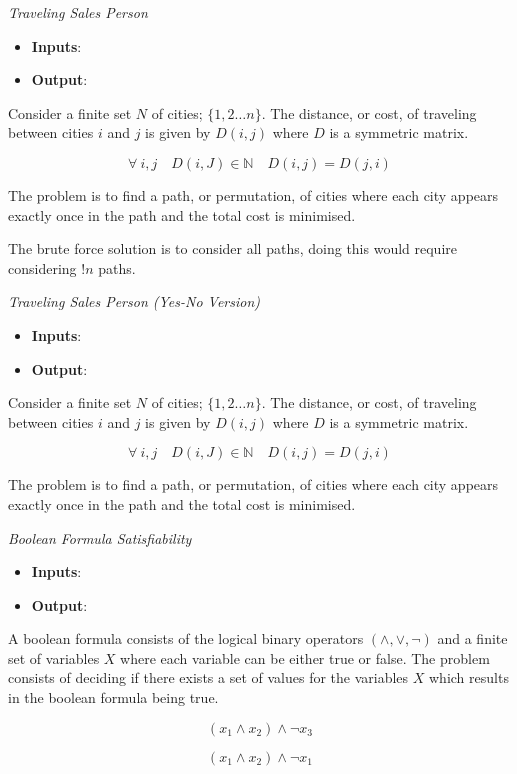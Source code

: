 \textit{Traveling Sales Person}\\
\begin{itemize}
    \item \textbf{Inputs}:
    \item \textbf{Output}:
\end{itemize}
Consider a finite set $N$ of cities; $\{1, 2 \dots n\}$. The distance, or cost,
of traveling between cities $i$ and $j$ is given by $D(i,j)$ where $D$
is a symmetric matrix.

$$\forall\ i, j\quad D(i,J) \in \mathbb{N}\quad D(i,j) = D(j,i)$$

The problem is to find a path, or permutation, of
cities where each city appears exactly once in the path and the total
cost is minimised.

The brute force solution is to consider all paths, doing this would require
considering $!n$ paths.

\textit{Traveling Sales Person (Yes-No Version)}\\
\begin{itemize}
    \item \textbf{Inputs}:
    \item \textbf{Output}:
\end{itemize}
Consider a finite set $N$ of cities; $\{1, 2 \dots n\}$. The distance, or cost,
of traveling between cities $i$ and $j$ is given by $D(i,j)$ where $D$
is a symmetric matrix.

$$\forall\ i, j\quad D(i,J) \in \mathbb{N}\quad D(i,j) = D(j,i)$$

The problem is to find a path, or permutation, of
cities where each city appears exactly once in the path and the total
cost is minimised.

\textit{Boolean Formula Satisfiability}\\
\begin{itemize}
    \item \textbf{Inputs}:
    \item \textbf{Output}:
\end{itemize}
A boolean formula consists of the logical binary operators $(\land, \lor, \neg)$
and a finite set of variables $X$ where each variable can be either true or false.
The problem consists of deciding if there exists a set of values for the variables $X$
which results in the boolean formula being true.

$$(x_1 \land x_2) \land \neg x_3$$

$$(x_1 \land x_2) \land \neg x_1$$

